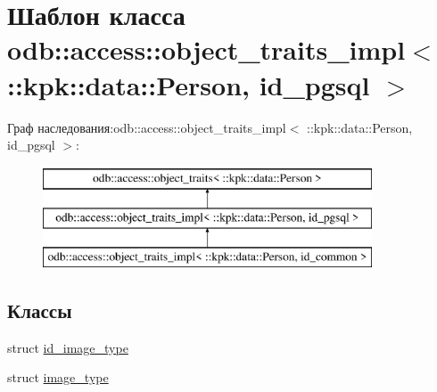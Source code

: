 \hypertarget{classodb_1_1access_1_1object__traits__impl_3_01_1_1kpk_1_1data_1_1_person_00_01id__pgsql_01_4}{}\section{Шаблон класса odb\+:\+:access\+:\+:object\+\_\+traits\+\_\+impl$<$ \+:\+:kpk\+:\+:data\+:\+:Person, id\+\_\+pgsql $>$}
\label{classodb_1_1access_1_1object__traits__impl_3_01_1_1kpk_1_1data_1_1_person_00_01id__pgsql_01_4}
Граф наследования\+:odb\+:\+:access\+:\+:object\+\_\+traits\+\_\+impl$<$ \+:\+:kpk\+:\+:data\+:\+:Person, id\+\_\+pgsql $>$\+:\begin{figure}[H]
\begin{center}
\leavevmode
\includegraphics[height=3.000000cm]{classodb_1_1access_1_1object__traits__impl_3_01_1_1kpk_1_1data_1_1_person_00_01id__pgsql_01_4}
\end{center}
\end{figure}
\subsection*{Классы}
\begin{DoxyCompactItemize}
\item 
struct \hyperlink{structodb_1_1access_1_1object__traits__impl_3_01_1_1kpk_1_1data_1_1_person_00_01id__pgsql_01_4_1_1id__image__type}{id\+\_\+image\+\_\+type}
\item 
struct \hyperlink{structodb_1_1access_1_1object__traits__impl_3_01_1_1kpk_1_1data_1_1_person_00_01id__pgsql_01_4_1_1image__type}{image\+\_\+type}
\end{DoxyCompactItemize}

